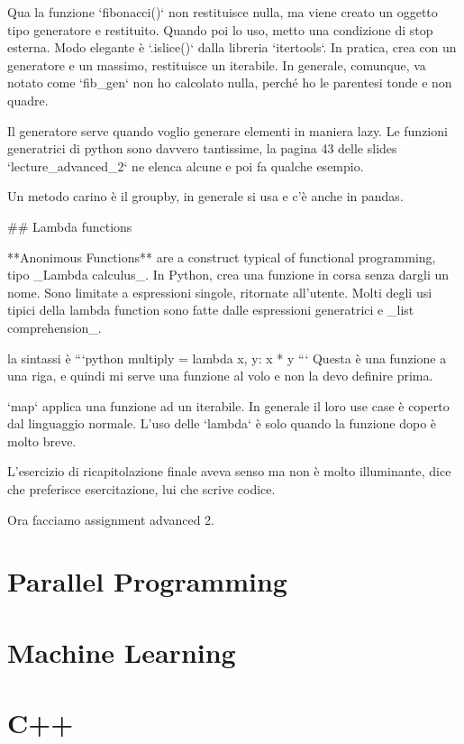 \documentclass[10pt, a4paper, twosided, titlepage, draft]{book}
\begin{document}
Qua la funzione `fibonacci()` non restituisce nulla, ma viene creato un oggetto tipo generatore e restituito. Quando poi lo uso, metto una condizione di stop esterna.
Modo elegante è `.islice()` dalla libreria `itertools`. In pratica, crea con un generatore e un massimo, restituisce un iterabile. In generale, comunque, va notato come `fib_gen` non ho calcolato nulla, perché ho le parentesi tonde e non quadre.

Il generatore serve quando voglio generare elementi in maniera lazy.
Le funzioni generatrici di python sono davvero tantissime, la pagina 43 delle slides `lecture_advanced_2` ne elenca alcune e poi fa qualche esempio.

Un metodo carino è il groupby, in generale si usa e c'è anche in pandas.

## Lambda functions

**Anonimous Functions** are a construct typical of functional programming, tipo _Lambda calculus_.
In Python, crea una funzione in corsa senza dargli un nome. Sono limitate a espressioni singole, ritornate all'utente. Molti degli usi tipici della lambda function sono fatte dalle espressioni generatrici e _list comprehension_.

la sintassi è 
```python
multiply = lambda x, y: x * y
```
Questa è una funzione a una riga, e quindi mi serve una funzione al volo e non la devo definire prima.

`map` applica una funzione ad un iterabile.
In generale il loro use case è coperto dal linguaggio normale.
L'uso delle `lambda` è solo quando la funzione dopo è molto breve.

L'esercizio di ricapitolazione finale aveva senso ma non è molto illuminante, dice che preferisce esercitazione, lui che scrive codice.

Ora facciamo assignment advanced 2.

\chapter{Parallel Programming}



\chapter{Machine Learning}



\chapter{C++}
\end{document}
